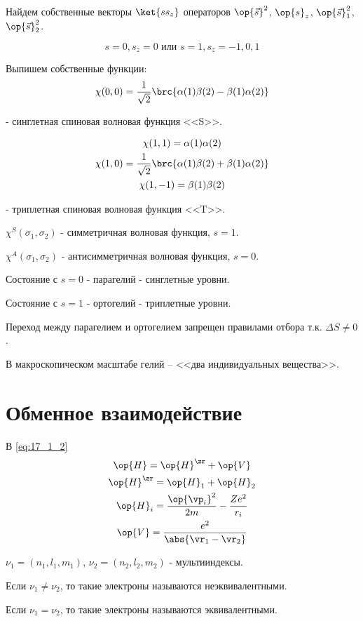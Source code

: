 Найдем собственные векторы $\ket{s s_z}$ операторов $\op{\vec{s}}^2$, $\op{s}_z$, $\op{\vec{s}}_1^2$, $\op{\vec{s}}_2^2$.

$$
s = 0, s_z = 0 \text{    или    } s = 1, s_z=-1, 0, 1
$$

Выпишем собственные функции:
$$
\chi(0, 0) = \frac{1}{\sqrt{2}}\brc{\alpha(1)\beta(2) - \beta(1)\alpha(2)}
$$

- синглетная спиновая волновая функция <<S>>.

\begin{gather*}
\chi(1, 1) = \alpha(1)\alpha(2) \\
\chi(1, 0) = \frac{1}{\sqrt{2}}\brc{\alpha(1)\beta(2) + \beta(1)\alpha(2)} \\
\chi(1, -1) = \beta(1)\beta(2)
\end{gather*}

- триплетная спиновая волновая функция <<T>>.

$\chi^S(\sigma_1, \sigma_2)$ - симметричная волновая функция, $s = 1$.

$\chi^A(\sigma_1, \sigma_2)$ - антисимметричная волновая функция, $s = 0$.

Состояние с $s = 0$ - парагелий - синглетные уровни.

Состояние с $s = 1$ - ортогелий - триплетные уровни.

Переход между парагелием и ортогелием запрещен правилами отбора т.к. $\Delta S \not = 0$.

В макроскопическом масштабе гелий -- <<два индивидуальных вещества>>.

\section{Обменное взаимодействие}

В \eqref{eq:17_1_2}
\begin{gather*}
\op{H} = \op{H}^\zr + \op{V} \\
\op{H}^\zr = \op{H}_1 + \op{H}_2 \\
\op{H}_i = \frac{\op{\vp_i}^2}{2m} - \frac{Ze^2}{r_i} \\
\op{V} = \frac{e^2}{\abs{\vr_1 - \vr_2}}
\end{gather*}

$\nu_1 = (n_1, l_1, m_1)$, $\nu_2 = (n_2, l_2, m_2)$ - мультииндексы.

Если $\nu_1 \not = \nu_2$, то такие электроны называются неэквивалентными.

Если $\nu_1 = \nu_2$, то такие электроны называются эквивалентными.

